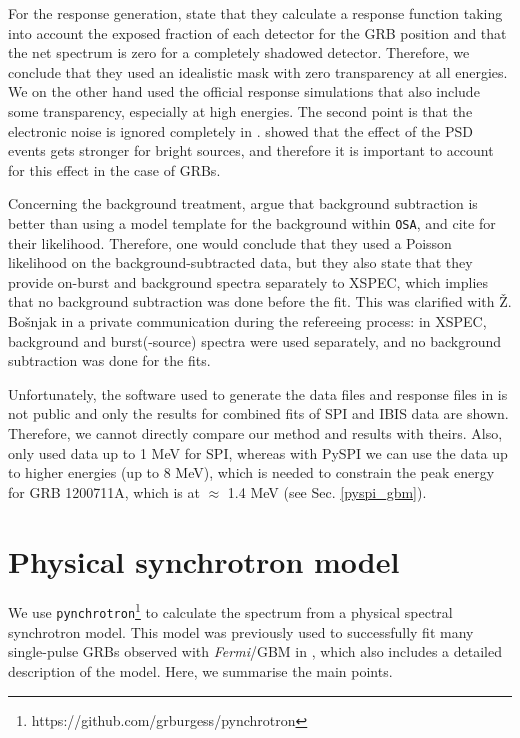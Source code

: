 \documentclass{aa}
\begin{document}
For the response generation, \citet{Bosnjak-2014} state that they calculate a response function taking into account the exposed fraction of each detector for the GRB position and that  the net
spectrum is zero for a completely shadowed detector. Therefore, we conclude that they used an idealistic mask with zero transparency at all energies. We on the other hand used the official response simulations that also include some transparency, especially at high energies. The second point is that the electronic noise is ignored completely in \citet{Bosnjak-2014}. \citet{spi_electronic_noise}  showed that the effect of the PSD events gets stronger for bright sources, and therefore it is important to account for this effect in the case of GRBs.

Concerning the background treatment, \citet{Bosnjak-2014} argue that background subtraction is better than using a model template for the background within {\tt OSA}, and cite  \citet{Cash-1979} for their likelihood. Therefore, one would conclude that they used a Poisson likelihood on the background-subtracted data, but they also state that they provide on-burst and background spectra separately to XSPEC, which implies that no background subtraction was done before the fit.  This was clarified with {\v{Z}}. Bo{\v{s}}njak in a private communication during the refereeing process: in XSPEC, background and burst(-source) spectra were used separately, and no background subtraction was done for the fits.

Unfortunately, the software used to generate the data files and response files in \citet{Bosnjak-2014} is not public and only the results for combined fits of SPI and IBIS data are shown. Therefore, we cannot directly compare our method and results with theirs. Also, \citet{Bosnjak-2014} only used data up to 1 MeV for SPI, whereas with PySPI we can use the data up to higher energies (up to 8 MeV), which is needed to constrain the peak energy for GRB 1200711A, which is at $\approx$ 1.4 MeV (see Sec. \ref{pyspi_gbm}).

\section{Physical synchrotron model}
\label{synch}
We use {\tt pynchrotron}\footnote{https://github.com/grburgess/pynchrotron} to calculate the spectrum from a physical spectral synchrotron model. This model was previously used to successfully fit many single-pulse GRBs observed with \textit{Fermi}/GBM in \citet{synch}, which also includes a detailed description of the model. Here, we summarise the main points.
\end{document}
